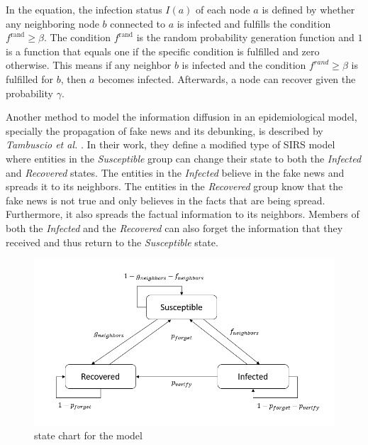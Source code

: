 In the equation, the infection status $I(a)$ of each node $a$ is defined 
by whether any neighboring node $b$ connected to $a$ is infected 
and fulfills the condition $f^{\mathrm{rand}}\geq \beta$.
The condition $f^{\mathrm{rand}}$ is the random probability generation function and $1$ 
is a function that equals one if the specific condition is fulfilled and 
zero otherwise. This means if any neighbor $b$ is infected and the 
condition $f^{rand}\geq \beta$ is fulfilled for $b$, then $a$ becomes infected. 
Afterwards, a node can recover given the probability $\gamma$.

Another method to model the information diffusion in an epidemiological model, 
specially the propagation of fake news and its debunking,
is described by \textit{Tambuscio et al.} \cite{sirsmodel}. In their work, they
define a modified type of SIRS model where entities in the \textit{Susceptible}
group can change their state to both the \textit{Infected} and
\textit{Recovered} states.
The entities in the \textit{Infected} believe in the fake news and spreads it 
to its neighbors.
The entities in the \textit{Recovered} group know that the fake news is not 
true and only believes in the facts that are being spread. Furthermore, it
also spreads the factual information to its neighbors.
Members of both the \textit{Infected} and the \textit{Recovered} can also forget
the information that they received and thus return to the \textit{Susceptible} state.

\begin{figure}[!ht]
    \center
    \includegraphics[scale=.9]{figs/Tambuscio.png}
    \caption{state chart for the model \cite{sirsmodel}}
    \label{originalmodelstatechart}
\end{figure}

